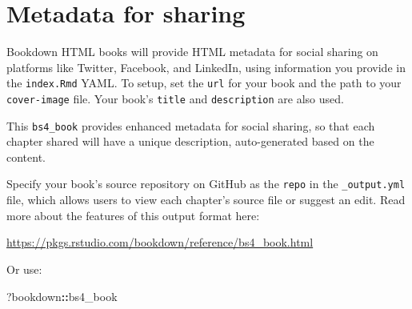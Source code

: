 \documentclass[
]{book}
\newenvironment{Shaded}{\begin{snugshade}}{\end{snugshade}}
\newcommand{\NormalTok}[1]{#1}
\newcommand{\SpecialCharTok}[1]{\textcolor[rgb]{0.81,0.36,0.00}{\textbf{#1}}}
\theoremstyle{definition}
\theoremstyle{definition}
\theoremstyle{definition}
\theoremstyle{definition}
\theoremstyle{remark}
\begin{document}
\hypertarget{metadata-for-sharing}{%
\section{Metadata for sharing}\label{metadata-for-sharing}}

Bookdown HTML books will provide HTML metadata for social sharing on platforms like Twitter, Facebook, and LinkedIn, using information you provide in the \texttt{index.Rmd} YAML. To setup, set the \texttt{url} for your book and the path to your \texttt{cover-image} file. Your book's \texttt{title} and \texttt{description} are also used.

This \texttt{bs4\_book} provides enhanced metadata for social sharing, so that each chapter shared will have a unique description, auto-generated based on the content.

Specify your book's source repository on GitHub as the \texttt{repo} in the \texttt{\_output.yml} file, which allows users to view each chapter's source file or suggest an edit. Read more about the features of this output format here:

\url{https://pkgs.rstudio.com/bookdown/reference/bs4_book.html}

Or use:

\begin{Shaded}
\begin{Highlighting}[]
\NormalTok{?bookdown}\SpecialCharTok{::}\NormalTok{bs4\_book}
\end{Highlighting}
\end{Shaded}


  
\end{document}
